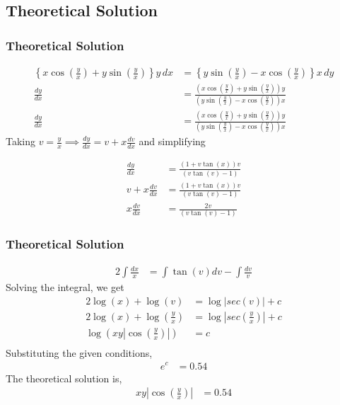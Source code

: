 \documentclass{beamer}
\providecommand{\brak}[1]{\ensuremath{\left(#1\right)}}
\theoremstyle{remark}
\providecommand{\abs}[1]{\left\vert#1\right\vert}
\numberwithin{equation}{section}
\begin{document}
\subsection{Theoretical Solution}
\begin{frame}
	\frametitle{Theoretical Solution}
	\begin{align}
		\left\{ x \cos\left(\frac{y}{x}\right) + y \sin\left(\frac{y}{x}\right) \right\} y \, dx &= 
		\left\{ y \sin\left(\frac{y}{x}\right) - x \cos\left(\frac{y}{x}\right) \right\} x \, dy \\ 
		\frac{dy}{dx} &= \frac{ \brak{x \cos\left(\frac{y}{x}\right) + y \sin\left(\frac{y}{x}\right) }y}{\brak{y \sin\left(\frac{y}{x}\right) - x \cos\left(\frac{y}{x}\right) }x} \\
		\frac{dy}{dx} &= \frac{ \brak{x \cos\left(\frac{y}{x}\right) + y \sin\left(\frac{y}{x}\right) }y}{\brak{y \sin\left(\frac{y}{x}\right) - x \cos\left(\frac{y}{x}\right) }x}
	\end{align}
	Taking $v = \frac{y}{x} \implies \frac{dy}{dx} = v + x\frac{dv}{dx}$ and simplifying
	
	\begin{align}
		\frac{dy}{dx} &= \frac{ \brak{1 + v \tan\brak{x} }v}{\brak{v \tan\brak{v} - 1 }}\\
		v + x\frac{dv}{dx} &= \frac{ \brak{1 + v \tan\brak{x} }v}{\brak{v \tan\brak{v} - 1 }}\\
		x\frac{dv}{dx} &= \frac{ 2v}{\brak{v \tan\brak{v} - 1 }}
	\end{align}
\end{frame}
\begin{frame}
	\frametitle{Theoretical Solution}
	\begin{align}
				2\int\frac{dx}{x} &=  \int\tan\brak{v}dv - \int\frac{dv}{v}
	\end{align}
	Solving the integral, we get
	\begin{align}
		2\log\brak{x} + \log{\brak{v}} &= \log|sec{\brak{v}|} + c \\
		2\log\brak{x} + \log{\brak{\frac{y}{x}}} &= \log\abs{sec{\brak{\frac{y}{x}}}} + c \\
		\log{\brak{xy\abs{\cos\brak{\frac{y}{x}}}}} &= c\\
	\end{align}
	Substituting the given conditions,
	\begin{align}
		e^c &= 0.54
	\end{align}
	The theoretical solution is,
	\begin{align}
		xy\abs{\cos\brak{\frac{y}{x}}} &= 0.54
	\end{align}
\end{frame}
\end{document}
